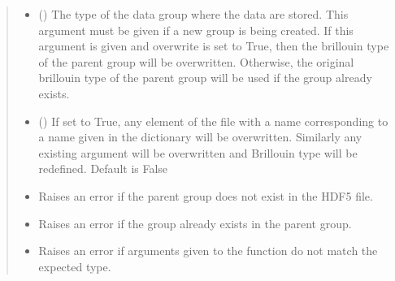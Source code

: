 \documentclass[letterpaper,10pt,english]{sphinxmanual}
\begin{document}
\begin{fulllineitems}
\begin{fulllineitems}
\begin{quote}
\begin{description}
\begin{itemize}
\item {} 
\sphinxAtStartPar
{} (\sphinxstyleliteralemphasis{\sphinxupquote{, }}) \textendash{} The type of the data group where the data are stored. This argument must be given if a new group is being created. If this argument is given and overwrite is set to True, then the brillouin type of the parent group will be overwritten. Otherwise, the original brillouin type of the parent group will be used if the group already exists.

\item {} 
\sphinxAtStartPar
{} (\sphinxstyleliteralemphasis{\sphinxupquote{, }}) \textendash{} If set to True, any element of the file with a name corresponding to a name given in the dictionary will be overwritten. Similarly any existing argument will be overwritten and Brillouin type will be redefined. Default is False

\end{itemize}

\begin{itemize}
\item {} 
\sphinxAtStartPar
{\hyperref[\detokenize{source/_autosummary/HDF5_BLS.errors:HDF5_BLS.errors.WrapperError_StructureError}]{}} \textendash{} Raises an error if the parent group does not exist in the HDF5 file.

\item {} 
\sphinxAtStartPar
{\hyperref[\detokenize{source/_autosummary/HDF5_BLS.errors:HDF5_BLS.errors.WrapperError_Overwrite}]{}} \textendash{} Raises an error if the group already exists in the parent group.

\item {} 
\sphinxAtStartPar
{\hyperref[\detokenize{source/_autosummary/HDF5_BLS.errors:HDF5_BLS.errors.WrapperError_ArgumentType}]{}} \textendash{} Raises an error if arguments given to the function do not match the expected type.

\end{itemize}


\end{description}
\end{quote}
\end{fulllineitems}
\end{fulllineitems}
\end{document}
